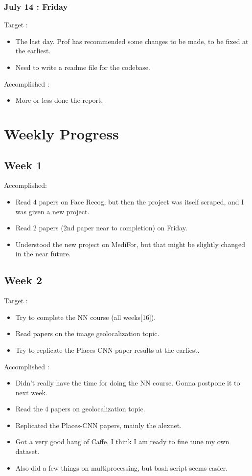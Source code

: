 \documentclass{article}
\begin{document}
\subsubsection{July 14 : Friday}
Target :
\begin{itemize}
\item The last day. Prof has recommended some changes to be made, to be fixed at the earliest.
\item Need to write a readme file for the codebase.
\end{itemize}

Accomplished :
\begin{itemize}
\item More or less done the report.
\end{itemize}
\section{Weekly Progress}
\subsection{Week 1}
Accomplished:
\begin{itemize}
\item Read 4 papers on Face Recog, but then the project was itself scraped, and I was given a new project.
\item Read 2 papers (2nd paper near to completion) on Friday.
\item Understood the new project on MediFor, but that might be slightly changed in the near future.
\end{itemize}


\subsection{Week 2}
Target :
\begin{itemize}
\item Try to complete the NN course (all weeks[16]).
\item Read papers on the image geolocalization topic.
\item Try to replicate the Places-CNN paper results at the earliest.
\end{itemize}

Accomplished :
\begin{itemize}
\item Didn't really have the time for doing the NN course. Gonna postpone it to next week.
\item Read the 4 papers on geolocalization topic.
\item Replicated the Places-CNN papers, mainly the alexnet.
\item Got a very good hang of Caffe. I think I am ready to fine tune my own dataset.
\item Also did a few things on multiprocessing, but bash script seems easier.
\end{itemize}
\end{document}
